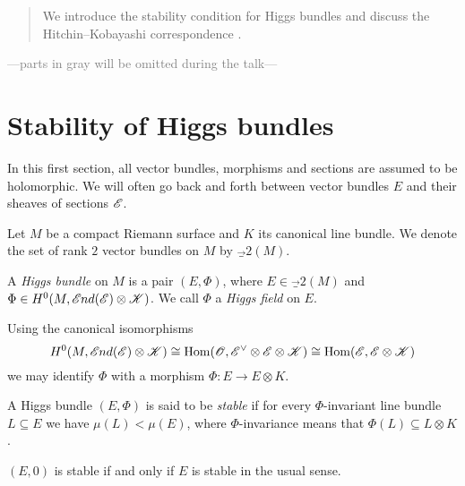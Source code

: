\documentclass[A4paper, 12pt, british, reqno]{amsart}
\DeclareMathOperator{\Hom}{Hom}
\newcommand{\ot}{\otimes}
\newcommand{\dual}{^{\vee}}
\begin{document}
\maketitle

\begin{abstract}
    We introduce the stability condition for Higgs bundles and discuss the Hitchin--Kobayashi correspondence \cite[\S 3 and \S 4]{hit87a}.
\end{abstract}

\tableofcontents

\begin{center}
\textcolor{gray}{---parts in gray will be omitted during the talk---}
\end{center}

\section{Stability of Higgs bundles}

\begin{unota}
    In this first section, all vector bundles, morphisms and sections are assumed to be holomorphic.
    We will often go back and forth between vector bundles $E$ and their sheaves of sections $\mathscr{E}$.
\end{unota}

Let $M$ be a compact Riemann surface and $K$ its canonical line bundle.
We denote the set of rank $2$ vector bundles on $M$ by $\Vec_{2}(M)$.

\begin{udefn}
    A \textit{Higgs bundle} on $M$ is a pair $(E,\Phi)$, where $E\in \Vec_{2}(M)$ and $\Phi\in H^{0}(M,\sEnd(\E)\ot \sK)$.
    We call $\Phi$ a \textit{Higgs field} on $E$.
\end{udefn}

\begin{urem}
    Using the canonical isomorphisms
    \[ H^{0}(M,\sEnd(\E)\ot \sK)\cong \Hom(\O,\E\dual \ot \E\ot \sK)\cong \Hom(\E,\E\ot \sK) \]
    we may identify $\Phi$ with a morphism $\Phi\colon E\to E\ot K$.
\end{urem}

\begin{udefn}[Stability]
    A Higgs bundle $(E,\Phi)$ is said to be \textit{stable} if for every $\Phi$-invariant line bundle $L\subseteq E$ we have $\mu(L)<\mu(E)$, where $\Phi$-invariance means that $\Phi(L)\subseteq L\ot K$.
\end{udefn}

\begin{urem}
    $(E,0)$ is stable if and only if $E$ is stable in the usual sense.
\end{urem}
\end{document}
